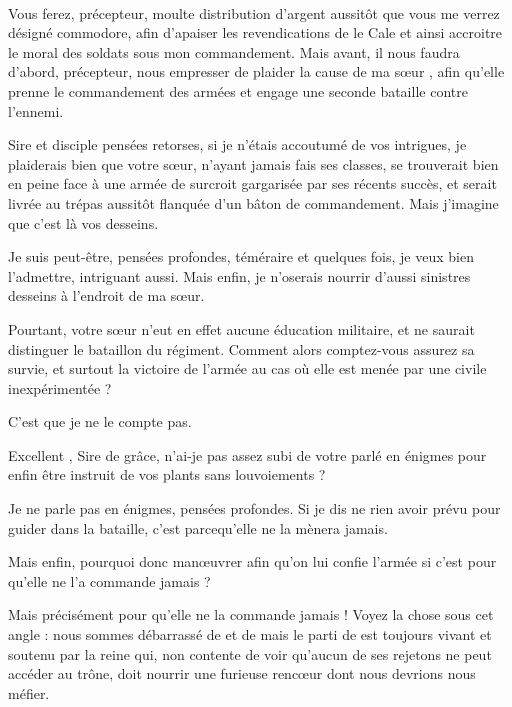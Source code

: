 \paragraph{}
\begin{drama}
  \elenaspeaks   Vous ferez, précepteur, moulte distribution d’argent aussitôt que vous me verrez désigné commodore, afin d’apaiser les revendications de le Cale et ainsi accroitre le moral des soldats sous mon commandement.  Mais avant, il nous faudra d’abord, précepteur, nous empresser de plaider la cause de ma sœur \ela, afin qu’elle prenne le commandement des armées et engage une seconde bataille contre l’ennemi.

  \alexasspeaks Sire et disciple \elena pensées retorses, si je n’étais accoutumé de vos intrigues, je plaiderais bien que \ela votre sœur, n’ayant jamais fais ses classes, se trouverait bien en peine face à une armée de surcroit gargarisée par ses récents succès, et serait livrée au trépas aussitôt flanquée d’un bâton de commandement. Mais j’imagine que c’est là vos desseins.

  \elenaspeaks  {} Je suis peut-être, \alexas pensées profondes, téméraire et quelques fois, je veux bien l’admettre, intriguant aussi.
  Mais enfin, je n’oserais nourrir d’aussi sinistres desseins à l’endroit de ma sœur.

  \alexasspeaks Pourtant, votre sœur n’eut en effet aucune éducation militaire, et ne saurait distinguer le bataillon du régiment. Comment alors comptez-vous assurez sa survie, et surtout la victoire de l’armée  au cas où elle est menée par une civile inexpérimentée ?

  \elenaspeaks  C’est que je ne le compte pas.

  \alexasspeaks Excellent \elena, Sire de grâce, n’ai-je pas assez subi de votre parlé en énigmes pour enfin être instruit de vos plants sans louvoiements ?

  \elenaspeaks  Je ne parle pas en énigmes, \alexas pensées profondes. Si je dis ne rien avoir prévu pour guider \ela{} dans la bataille, c’est parcequ’elle ne la mènera jamais.

  \alexasspeaks Mais enfin, pourquoi donc manœuvrer afin qu’on lui confie l’armée si c’est pour qu’elle ne l’a commande jamais ?

  \elenaspeaks  Mais précisément pour qu’elle ne la commande jamais ! Voyez la chose sous cet angle : nous sommes débarrassé de \general{} et de \princesse{} mais le parti de \princesse{} est toujours vivant et soutenu par la reine qui, non contente de voir qu’aucun de ses rejetons ne peut accéder au trône, doit nourrir une furieuse rencœur dont nous devrions nous méfier.


\end{drama}
